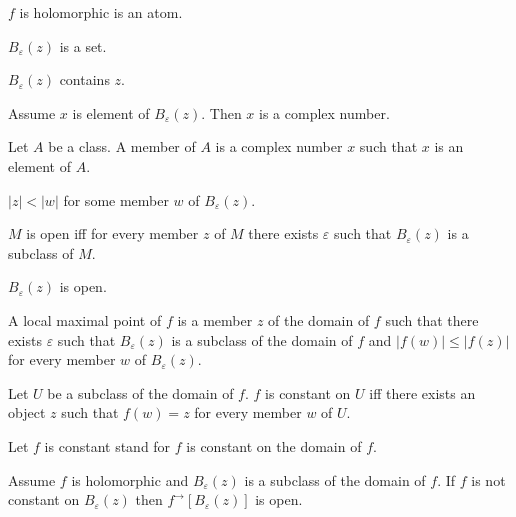 \documentclass{article}
\newcommand{\Ball}[2]{B_{#1}(#2)}
\newcommand{\image}[2]{#1^{\to}[#2]}
\begin{document}
  \begin{forthel}
    \begin{signature}
      $f$ is holomorphic is an atom.
    \end{signature}

    \begin{signature}
      $\Ball{\varepsilon}{z}$ is a set.
    \end{signature}

    \begin{axiom}
       $\Ball{\varepsilon}{z}$ contains $z$.
    \end{axiom}

    \begin{axiom}
      Assume $x$ is element of $\Ball{\varepsilon}{z}$. Then $x$ is a complex number.
    \end{axiom}

    \begin{definition}
      Let $A$ be a class.
      A member of $A$ is a complex number $x$ such that $x$ is an element of $A$.
    \end{definition}

    \begin{axiom}
      $|z| < |w|$ for some member $w$ of $\Ball{\varepsilon}{z}$.
    \end{axiom}

    \begin{definition}
      $M$ is open iff for every member $z$ of $M$ there exists $\varepsilon$ such that
        $\Ball{\varepsilon}{z}$ is a subclass of $M$.
    \end{definition}

    \begin{axiom}
      $\Ball{\varepsilon}{z}$ is open.
    \end{axiom}

    \begin{definition}
      A local maximal point of $f$ is a member $z$ of the domain of $f$ such that there exists $\varepsilon$
        such that $\Ball{\varepsilon}{z}$ is a subclass of the domain of $f$ and $|f(w)| \leq |f(z)|$ for every member $w$ of $\Ball{\varepsilon}{z}$.
    \end{definition}

    \begin{definition}
      Let $U$ be a subclass of the domain of $f$.
      $f$ is constant on $U$ iff there exists an object $z$ such that $f(w) = z$ for every member $w$ of $U$.
    \end{definition}

    Let $f$ is constant stand for $f$ is constant on the domain of $f$.

    \begin{axiom}
      Assume $f$ is holomorphic and $\Ball{\varepsilon}{z}$ is a subclass of the domain of $f$.
      If $f$ is not constant on $\Ball{\varepsilon}{z}$
        then $\image{f}{\Ball{\varepsilon}{z}}$ is open.
    \end{axiom}
  \end{forthel}
\end{document}

